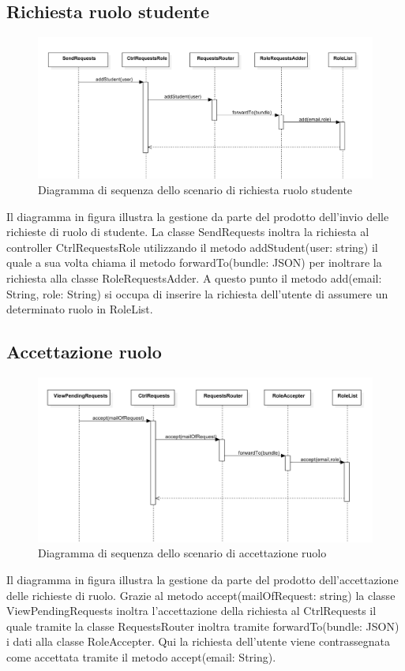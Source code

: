 \documentclass[a4paper, titlepage]{article}
\begin{document}
\newpage
\subsection{Richiesta ruolo studente}
\begin{figure}[!h]
	\centering
	\includegraphics[scale=0.5]{Img/seq-rolerequest.pdf}
	\caption{Diagramma di sequenza dello scenario di richiesta ruolo studente }
\end{figure}
Il diagramma in figura illustra la gestione da parte del prodotto dell'invio delle richieste di ruolo di studente. La classe SendRequests inoltra la richiesta al controller CtrlRequestsRole utilizzando il metodo addStudent(user: string) il quale a sua volta chiama il metodo forwardTo(bundle: JSON) per inoltrare la richiesta alla classe RoleRequestsAdder. A questo punto il metodo add(email: String, role: String) si occupa di inserire la richiesta dell'utente di assumere un determinato ruolo in RoleList.

\subsection{Accettazione ruolo}
\begin{figure}[!h]
	\centering
	\includegraphics[scale=0.5]{Img/seq-acceptrequest.pdf}
	\caption{Diagramma di sequenza dello scenario di accettazione ruolo}
\end{figure}
Il diagramma in figura illustra la gestione da parte del prodotto dell'accettazione delle richieste di ruolo. Grazie al metodo accept(mailOfRequest: string) la classe ViewPendingRequests inoltra l'accettazione della richiesta al CtrlRequests il quale tramite la classe RequestsRouter inoltra tramite forwardTo(bundle: JSON) i dati alla classe RoleAccepter. Qui la richiesta dell'utente viene contrassegnata come accettata tramite il metodo accept(email: String).
\end{document}
